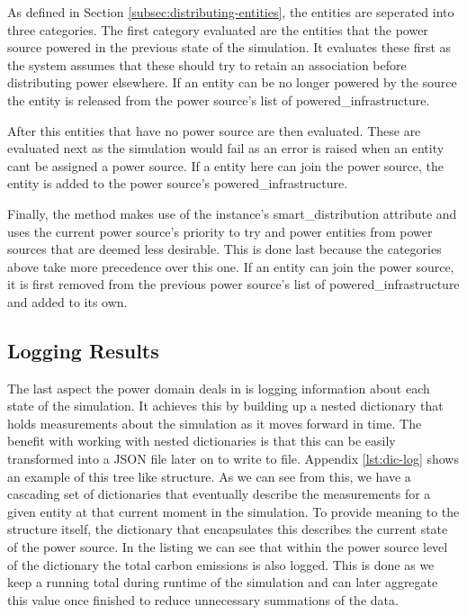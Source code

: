 \documentclass{l4proj}
\begin{document}
As defined in Section \ref{subsec:distributing-entities}, the entities are seperated into three categories.
The first category evaluated are the entities that the power source powered in the previous state of the simulation.
It evaluates these first as the system assumes that these should try to retain an association before distributing power elsewhere.
If an entity can be no longer powered by the source the entity is released from the power source's list of powered\_infrastructure.

After this entities that have no power source are then evaluated.
These are evaluated next as the simulation would fail as an error is raised when an entity cant be assigned a power source.
If a entity here can join the power source, the entity is added to the power source's powered\_infrastructure.

Finally, the method makes use of the instance's smart\_distribution attribute and uses the current power source's priority to try and power entities from power sources that are deemed less desirable.
This is done last because the categories above take more precedence over this one.
If an entity can join the power source, it is first removed from the previous power source's list of powered\_infrastructure and added to its own.

\subsection{Logging Results}\label{imp:subsec:logging-results}
The last aspect the power domain deals in is logging information about each state of the simulation.
It achieves this by building up a nested dictionary that holds measurements about the simulation as it moves forward in time.
The benefit with working with nested dictionaries is that this can be easily transformed into a JSON file later on to write to file.
Appendix \ref{lst:dic-log} shows an example of this tree like structure.
As we can see from this, we have a cascading set of dictionaries that eventually describe the measurements for a given entity at that current moment in the simulation.
To provide meaning to the structure itself, the dictionary that encapsulates this describes the current state of the power source.
In the listing we can see that within the power source level of the dictionary the total carbon emissions is also logged.
This is done as we keep a running total during runtime of the simulation and can later aggregate this value once finished to reduce unnecessary summations of the data.
\end{document}
